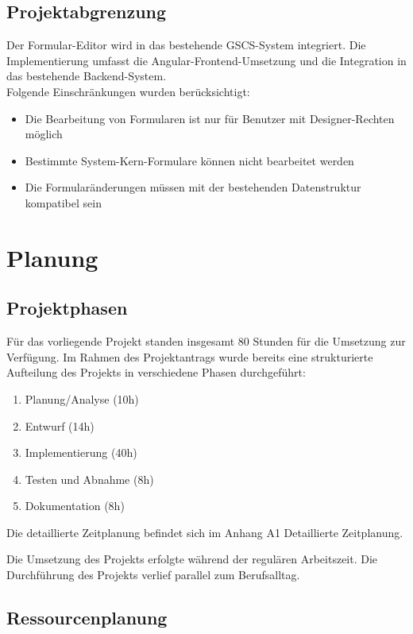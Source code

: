 \documentclass[a4paper,11pt]{article}
\begin{document}
\subsection{Projektabgrenzung}

Der Formular-Editor wird in das bestehende GSCS-System integriert. Die Implementierung umfasst die Angular-Frontend-Umsetzung und die Integration in das bestehende Backend-System.\\
Folgende Einschränkungen wurden berücksichtigt:

\begin{itemize}
\item Die Bearbeitung von Formularen ist nur für Benutzer mit Designer-Rechten möglich
\item Bestimmte System-Kern-Formulare können nicht bearbeitet werden
\item Die Formularänderungen müssen mit der bestehenden Datenstruktur kompatibel sein
\end{itemize}

\section{Planung}

\subsection{Projektphasen}

Für das vorliegende Projekt standen insgesamt 80 Stunden für die Umsetzung zur Verfügung. Im Rahmen des Projektantrags wurde bereits eine strukturierte Aufteilung des Projekts in verschiedene Phasen durchgeführt:

\begin{enumerate}
\item Planung/Analyse (10h)
\item Entwurf (14h)
\item Implementierung (40h)
\item Testen und Abnahme (8h)
\item Dokumentation (8h)
\end{enumerate}

Die detaillierte Zeitplanung befindet sich im Anhang A1 Detaillierte Zeitplanung.

Die Umsetzung des Projekts erfolgte während der regulären Arbeitszeit. Die Durchführung des Projekts verlief parallel zum Berufsalltag.

\subsection{Ressourcenplanung}
\end{document}
